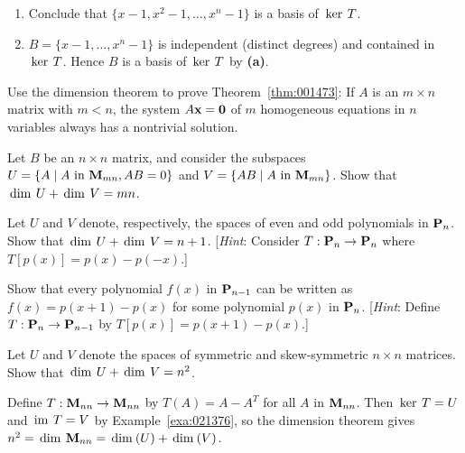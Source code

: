 \begin{multicols}{2}
\begin{ex}
\begin{enumerate}[label={\alph*.}]
\item Conclude that $\{x - 1, x^{2} - 1, \dots, x^{n} - 1\}$ is a basis of $\thinspace\operatorname{ker \medspace}T$.

\end{enumerate}
\begin{sol}
\begin{enumerate}[label={\alph*.}]
\setcounter{enumi}{1}
\item  $B = \{x - 1, \dots, x^{n} - 1\}$ is independent (distinct degrees) and contained in $\thinspace\operatorname{ker \medspace}T$. Hence $B$ is a basis of $\thinspace\operatorname{ker \medspace}T$ by \textbf{(a)}.

\end{enumerate}
\end{sol}
\end{ex}

\begin{ex}
Use the dimension theorem to prove Theorem~\ref{thm:001473}: If $A$ is an $m \times n$ matrix with $m < n$, the system $A\textbf{x} = \textbf{0}$ of $m$ homogeneous equations in $n$ variables always has a nontrivial solution.
\end{ex}

\begin{ex}
Let $B$ be an $n \times n$ matrix, and consider the subspaces $U = \{A \mid A \mbox{ in } \textbf{M}_{mn}, AB = 0\}$ and $V = \{AB \mid A \mbox{ in } \textbf{M}_{mn}\}$. Show that $\thinspace\operatorname{dim \medspace}U + \thinspace\operatorname{dim \medspace}V = mn$.
\end{ex}

\begin{ex}
Let $U$ and $V$ denote, respectively, the spaces of even and odd polynomials in $\textbf{P}_{n}$. Show that $\thinspace\operatorname{dim \medspace}U + \thinspace\operatorname{dim \medspace}V = n + 1$. [\textit{Hint}: Consider $T : \textbf{P}_{n} \to \textbf{P}_{n}$ where $T\left[p(x)\right] = p(x) - p(-x)$.]
\end{ex}

\begin{ex}
Show that every polynomial $f(x)$ in $\textbf{P}_{n-1}$ can be written as $f(x) = p(x + 1) - p(x)$ for some polynomial $p(x)$ in $\textbf{P}_{n}$. [\textit{Hint}: Define $T : \textbf{P}_{n} \to \textbf{P}_{n-1}$ by $T\left[p(x)\right] = p(x + 1) - p(x)$.]
\end{ex}

\begin{ex}
Let $U$ and $V$ denote the spaces of symmetric and skew-symmetric $n \times n$ matrices. Show that $\thinspace\operatorname{dim \medspace}U + \thinspace\operatorname{dim \medspace}V = n^{2}$.

\begin{sol}
Define $T : \textbf{M}_{nn} \to \textbf{M}_{nn}$ by $T(A) = A - A^{T}$ for all $A$ in $\textbf{M}_{nn}$. Then $\thinspace\operatorname{ker \medspace}T = U$ and $\thinspace\operatorname{im \medspace}T = V$ by Example~\ref{exa:021376}, so the dimension theorem gives $n^{2} = \thinspace\operatorname{dim \medspace}\textbf{M}_{nn} = \thinspace\operatorname{dim\medspace}(U) + \thinspace\operatorname{dim\medspace}(V)$.
\end{sol}
\end{ex}


\end{multicols}
